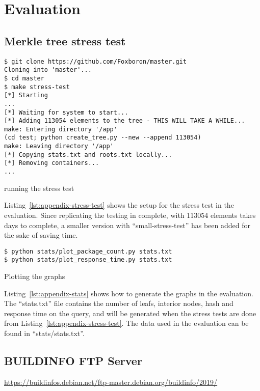 \documentclass[../Main/thesis.tex]{subfiles}
\begin{document}
\chapter{Evaluation}%
\label{appendix:evaluation}

\section{Merkle tree stress test}%
\label{appendix:merkle_tree_stress_test}

\begin{listing}[H]
\begin{verbatim}
$ git clone https://github.com/Foxboron/master.git
Cloning into 'master'...
$ cd master 
$ make stress-test
[*] Starting
...
[*] Waiting for system to start...
[*] Adding 113054 elements to the tree - THIS WILL TAKE A WHILE...
make: Entering directory '/app'
(cd test; python create_tree.py --new --append 113054)
make: Leaving directory '/app'
[*] Copying stats.txt and roots.txt locally...
[*] Removing containers...
...
\end{verbatim}
\caption{running the stress test}
\label{lst:appendix-stress-test}
\end{listing}

Listing~\ref{lst:appendix-stress-test} shows the setup for the stress test in
the evaluation. Since replicating the testing in complete, with 113054 elements
takes days to complete, a smaller version with ``small-stress-test'' has been
added for the sake of saving time.

    

\begin{listing}[H]
\begin{verbatim}
$ python stats/plot_package_count.py stats.txt
$ python stats/plot_response_time.py stats.txt
\end{verbatim}
\caption{Plotting the graphs}
\label{lst:appendix-stats}
\end{listing}

Listing~\ref{lst:appendix-stats} shows how to generate the graphs in the
evaluation. The ``stats.txt'' file contains the number of leafs, interior nodes,
hash and response time on the query, and will be generated when the stress tests
are done from Listing~\ref{lst:appendix-stress-test}. The data used in the
evaluation can be found in ``stats/stats.txt''.


\section{BUILDINFO FTP Server}%
\label{appendix:buildinfo_ftp_server}
\url{https://buildinfos.debian.net/ftp-master.debian.org/buildinfo/2019/}
\end{document}
